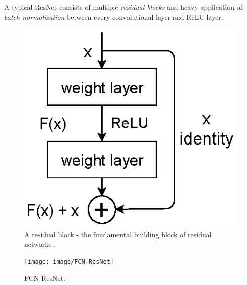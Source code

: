 \documentclass[conference]{IEEEtran}
\begin{document}
A typical ResNet consists of multiple \textit{residual blocks} and heavy
application of \textit{batch normalization} between every convolutional layer
and ReLU layer.

\begin{center}
	\begin{figure}
		\begin{center}
			\includegraphics[scale=1]{image/Skip_ResNet}
		\end{center}
		\caption{A residual block - the fundamental building block of residual
		networks \cite{he2016deep}.}
		\label{residualblock}
	\end{figure}
\end{center}

\begin{center}
	\begin{figure}
		\begin{center}
			\texttt{[image: image/FCN-ResNet]}
		\end{center}
		\caption{FCN-ResNet.}
		\label{fcn-resnet}
	\end{figure}
\end{center}
\end{document}
